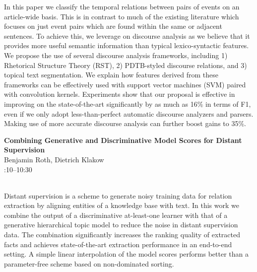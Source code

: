 \documentclass[twoside,makeidx]{book}
\renewcommand{\normalsize}{\fontsize{8}{9}\selectfont}
\renewcommand{\small}{\fontsize{7}{8}\selectfont}
\begin{document}
\nopagebreak%
\noindent%
{\small In this paper we classify the temporal relations between pairs of events on an article-wide basis. This is in contrast to much of the existing literature which focuses on just event pairs which are found within the same or adjacent sentences. To achieve this, we leverage on discourse analysis as we believe that it provides more useful semantic information than typical lexico-syntactic features. We propose the use of several discourse analysis frameworks, including 1) Rhetorical Structure Theory (RST), 2) PDTB-styled discourse relations, and 3) topical text segmentation. We explain how features derived from these frameworks can be effectively used with support vector machines (SVM) paired with convolution kernels. Experiments show that our proposal is effective in improving on the state-of-the-art significantly by as much as 16\% in terms of F1, even if we only adopt less-than-perfect automatic discourse analyzers and parsers. Making use of more accurate discourse analysis can further boost gains to 35\%.}
\par\vspace{2em}\noindent%
\begin{minipage}{\linewidth}%
\begin{center}
\textbf{\normalsize Combining Generative and Discriminative Model Scores for Distant Supervision}\\
\normalsize  Benjamin Roth,  Dietrich Klakow\\
{\small 10:10--10:30}\\
\end{center}
\end{minipage}\\[0.5em]
\nopagebreak%
\noindent%
{\small Distant supervision is a scheme to generate noisy training data for relation extraction by aligning entities of a knowledge base with text. In this work we combine the output of a discriminative at-least-one learner with that of a generative hierarchical topic model to reduce the noise in distant supervision data. The combination significantly increases the ranking quality of extracted facts and achieves state-of-the-art extraction performance in an end-to-end setting. A simple linear interpolation of the model scores performs better than a parameter-free scheme based on non-dominated sorting.}
\clearpage
\end{document}
